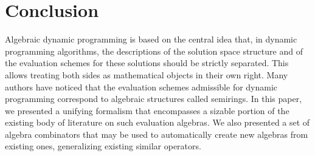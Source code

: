












\section{Conclusion}

Algebraic dynamic programming is based on the central idea that, in dynamic programming algorithms, the descriptions of the solution space structure and of the evaluation schemes for these solutions should be strictly separated.
This allows treating both sides as mathematical objects in their own right.
Many authors have noticed that the evaluation schemes admissible for dynamic programming correspond to algebraic structures called semirings.
In this paper, we presented a unifying formalism that encompasses a sizable portion of the existing body of literature on such evaluation algebras.
We also presented a set of algebra combinators that may be used to automatically create new algebras from existing ones, generalizing existing similar operators.

